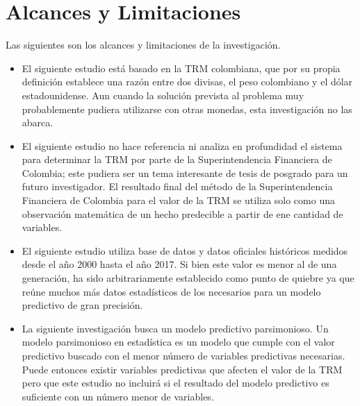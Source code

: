 \section{Alcances y Limitaciones}
Las siguientes son los alcances y limitaciones de la investigación.

\begin{itemize}
	\item El siguiente estudio está basado en la TRM colombiana, que por su propia definición establece una razón entre dos divisas, el peso colombiano y el dólar estadounidense. Aun cuando la solución prevista al problema muy probablemente pudiera utilizarse con otras monedas, esta investigación no las abarca.
	\item El siguiente estudio no hace referencia ni analiza en profundidad el sistema para determinar la TRM por parte de la Superintendencia Financiera de Colombia; este pudiera ser un tema interesante de tesis de posgrado para un futuro investigador. El resultado final del método de la Superintendencia Financiera de Colombia para el valor de la TRM se utiliza solo como una observación matemática de un hecho predecible a partir de ene cantidad de variables.
	\item El siguiente estudio utiliza base de datos y datos oficiales históricos medidos desde el año 2000 hasta el año 2017. Si bien este valor es menor al de una generación, ha sido arbitrariamente establecido como punto de quiebre ya que reúne muchos más datos estadísticos de los necesarios para un modelo predictivo de gran precisión.
	\item La siguiente investigación busca un modelo predictivo parsimonioso. Un modelo parsimonioso en estadística es un modelo que cumple con el valor predictivo buscado con el menor número de variables predictivas necesarias. Puede entonces existir variables predictivas que afecten el valor de la TRM pero que este estudio no incluirá si el resultado del modelo predictivo es suficiente con un número menor de variables.
\end{itemize}
